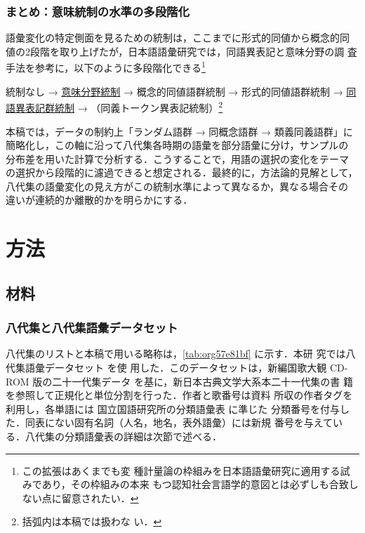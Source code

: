 \documentclass[submit]{ipsj}
\renewcommand{\ref}{\cref}
\begin{document}
\subsubsection{まとめ：意味統制の水準の多段階化}
\label{sec:orge0c689f}
語彙変化の特定側面を見るための統制は，ここまでに形式的同値から概念的同
値の2段階を取り上げたが，日本語語彙研究では，同語異表記と意味分野の調
査手法を参考に，以下のように多段階化できる\footnote{この拡張はあくまでも変
種計量論の枠組みを日本語語彙研究に適用する試みであり，その枠組みの本来
もつ認知社会言語学的意図とは必ずしも合致しない点に留意されたい．}

統制なし → \uline{意味分野統制} → 概念的同値語群統制 → 形式的同値語群統制 → \uline{同
語異表記群統制} → （同義トークン異表記統制）\footnote{括弧内は本稿では扱わな
い．}

本稿では，データの制約上「ランダム語群 → 同概念語群 → 類義同義語群」に
簡略化し，この軸に沿って八代集各時期の語彙を部分語彙に分け，サンプルの
分布差を用いた計算で分析する．こうすることで，用語の選択の変化をテーマ
の選択から段階的に濾過できると想定される．最終的に，方法論的見解として，
八代集の語彙変化の見え方がこの統制水準によって異なるか，異なる場合その
違いが連続的か離散的かを明らかにする．
\section{方法\label{org3b0099d}}
\label{sec:orgd6f6211}
\subsection{材料\label{orgc784b0e}}
\label{sec:org9cbb7d6}
\subsubsection{八代集と八代集語彙データセット\label{org18afc10}}
\label{sec:org77aab05}
八代集のリストと本稿で用いる略称は，\ref{tab:org57e81bf} に示す．本研
究では八代集語彙データセット \cite{Hodoscek2022Developmenta} を使
用した．このデータセットは，新編国歌大観 CD-ROM 版の二十一代集データ
\cite{shinhen1996CDROM} を基に，新日本古典文学大系本二十一代集の書
籍を参照して正規化と単位分割を行った．作者と歌番号は資料
\cite{nakamura1999Kokubungaku} 所収の作者タグを利用し，各単語には
国立国語研究所の分類語彙表 \cite{nakano1994Bunruigoihyo} に準じた
分類番号を付与した．同表にない固有名詞（人名，地名，表外語彙）には新規
番号を与えている．八代集の分類語彙表の詳細は次節で述べる．
\end{document}
